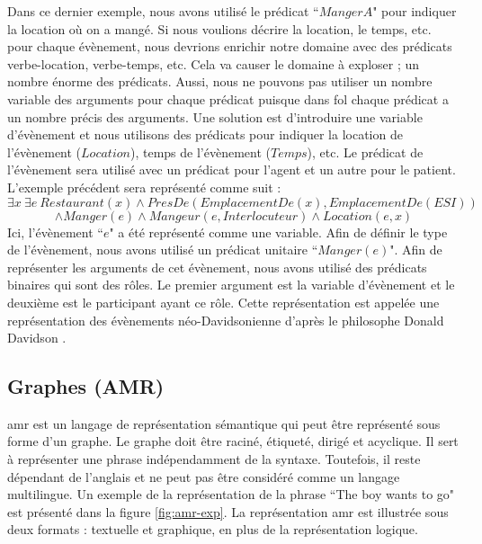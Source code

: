 \documentclass{KodeBook}
\begin{document}
Dans ce dernier exemple, nous avons utilisé le prédicat ``$MangerA$" pour indiquer la location où on a mangé. 
Si nous voulions décrire la location, le temps, etc. pour chaque évènement, nous devrions enrichir notre domaine avec des prédicats verbe-location, verbe-temps, etc. 
Cela va causer le domaine à exploser ; un nombre énorme des prédicats. 
Aussi, nous ne pouvons pas utiliser un nombre variable des arguments pour chaque prédicat puisque dans \ac{fol} chaque prédicat a un nombre précis des arguments. 
Une solution est d'introduire une variable d'évènement et nous utilisons des prédicats pour indiquer la location de l'évènement ($Location$), temps de l'évènement ($Temps$), etc.
Le prédicat de l'évènement sera utilisé avec un prédicat pour l'agent et un autre pour le patient.
L'exemple précédent sera représenté comme suit : 
\[\exists x\ \exists e\ Restaurant(x) \wedge PresDe(EmplacementDe(x), EmplacementDe(ESI))\]
\[\wedge Manger(e) \wedge  Mangeur(e, Interlocuteur) \wedge Location(e, x)\]
Ici, l'évènement ``$e$" a été représenté comme une variable. 
Afin de définir le type de l'évènement, nous avons utilisé un prédicat unitaire ``$Manger(e)$". 
Afin de représenter les arguments de cet évènement, nous avons utilisé des prédicats binaires qui sont des rôles.
Le premier argument est la variable d'évènement et le deuxième est le participant ayant ce rôle.
Cette représentation est appelée une représentation des évènements néo-Davidsonienne d'après le philosophe Donald Davidson \cite{1967-davidson}.



\subsection{Graphes (AMR)}

\ac{amr} est un langage de représentation sémantique \cite{2013-banarescu-al} qui peut être représenté sous forme d'un graphe. 
Le graphe doit être raciné, étiqueté, dirigé et acyclique. 
Il sert à représenter une phrase indépendamment de la syntaxe.
Toutefois, il reste dépendant de l'anglais et ne peut pas être considéré comme un langage multilingue.
Un exemple de la représentation de la phrase ``The boy wants to go" est présenté dans la figure \ref{fig:amr-exp}.
La représentation \ac{amr} est illustrée sous deux formats : textuelle et graphique, en plus de la représentation logique.
\end{document}
